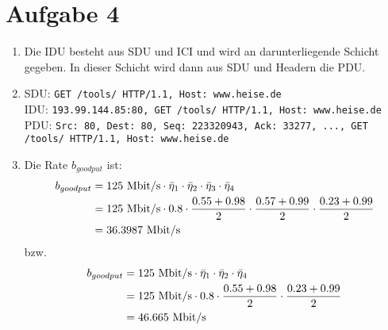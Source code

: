\documentclass{article}
\begin{document}
	
	\section*{Aufgabe 4}
	\begin{enumerate}[label=(\alph*)]
		\item Die IDU besteht aus SDU und ICI und wird an darunterliegende Schicht gegeben. In dieser Schicht wird dann aus SDU und Headern die PDU.
		\item SDU: \texttt{GET /tools/ HTTP/1.1, Host: www.heise.de} \\
		IDU: \texttt{193.99.144.85:80, GET /tools/ HTTP/1.1, Host: www.heise.de} \\
		PDU: \texttt{Src: 80, Dest: 80, Seq: 223320943, Ack: 33277, ..., GET /tools/ HTTP/1.1, Host: www.heise.de}
		\item Die Rate $b_{goodput}$ ist:
		\begin{align}
			b_{goodput} &= 125 \text{ Mbit/s} \cdot \bar{\eta}_1 \cdot \bar{\eta}_2 \cdot \bar{\eta}_3 \cdot \bar{\eta}_4 \notag \\
			&= 125 \text{ Mbit/s} \cdot 0.8 \cdot \frac{0.55+0.98}{2} \cdot \frac{0.57+0.99}{2} \cdot \frac{0.23+0.99}{2} \notag \\
			&= 36.3987 \text{ Mbit/s} \notag
		\end{align}
		bzw.
		\begin{align}
			b_{goodput} &= 125 \text{ Mbit/s} \cdot \bar{\eta}_1 \cdot \bar{\eta}_2 \cdot \bar{\eta}_4 \notag \\
			&= 125 \text{ Mbit/s} \cdot 0.8 \cdot \frac{0.55+0.98}{2} \cdot \frac{0.23+0.99}{2} \notag \\
			&= 46.665 \text{ Mbit/s} \notag
		\end{align}
	\end{enumerate}
	
\end{document}

